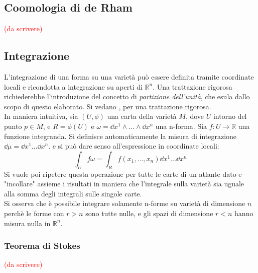 \subsection{Coomologia di de Rham}
\textcolor{red}{(da scrivere)}
\subsection{Integrazione}
L'integrazione di una forma su una varietà può essere definita
tramite coordinate locali e ricondotta a integrazione su aperti di $\mathbb{R}^n$.
Una trattazione rigorosa richiederebbe l'introduzione del concetto di
\emph{partizione dell'unità}, che esula dallo scopo di questo elaborato.
Si vedano \cite{boothby},\cite{nakahara} per una trattazione rigorosa. \\
In maniera intuitiva, sia $(U,\phi)$ una carta della
varietà $M$, dove $U$ intorno del punto $p \in M$, e $R = \phi(U)$ e
$\omega = \dd x^1 \wedge \dots \wedge \dd x^n$ una n-forma.
Sia $f : U \to \mathbb{R}$ una funzione integranda.
Si definisce automaticamente la misura di integrazione $\dd \mu = \dd x^1 \dots \dd x^n$.
e si può dare senso all'espressione in coordinate locali:
$$
   \int_U f\omega = \int_R f(x_1,\dots,x_n) \dd x^1 \dots \dd x ^n
$$
Si vuole poi ripetere questa operazione per tutte le carte di un atlante dato e
"incollare" assieme i risultati in maniera che l'integrale sulla varietà sia uguale
alla somma degli integrali sulle singole carte.\\

Si osserva che è possibile integrare solamente n-forme su varietà di dimensione $n$
perchè le forme con $r>n$ sono tutte nulle, e gli spazi di dimensione $r<n$ hanno
misura nulla in $\mathbb{R}^n$.

\subsubsection{Teorema di Stokes}
\textcolor{red}{(da scrivere)}
